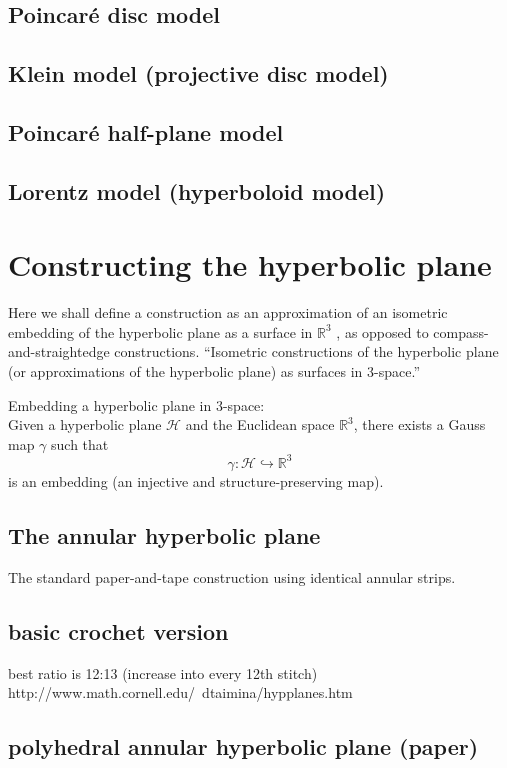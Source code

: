 \documentclass[letterpaper,titlepage]{article}
\begin{document}
\subsection{Poincar\'e disc model}
\subsection{Klein model (projective disc model)}
\subsection{Poincar\'e half-plane model}
\subsection{Lorentz model (hyperboloid model)}

\section{Constructing the hyperbolic plane}
Here we shall define a construction as an approximation of an isometric embedding of the hyperbolic plane as a surface in $\mathbb{R}^3$ \cite{crochetplane}, as opposed to compass-and-straightedge constructions.
``Isometric constructions of the hyperbolic plane (or approximations of the hyperbolic plane) as surfaces in 3-space.'' \cite{crochetplane}

Embedding a hyperbolic plane in 3-space:\\
Given a hyperbolic plane $\mathcal{H}$ and the Euclidean space $\mathbb{R}^3$, there exists a Gauss map $\gamma$ such that
\[ \gamma : \mathcal{H} \hookrightarrow \mathbb{R}^3 \]
is an embedding (an injective and structure-preserving map).

\subsection{The annular hyperbolic plane}
The standard paper-and-tape construction using identical annular strips.
\subsection{basic crochet version}
best ratio is 12:13 (increase into every 12th stitch) http://www.math.cornell.edu/~dtaimina/hypplanes.htm
\subsection{polyhedral annular hyperbolic plane (paper)}
\end{document}
